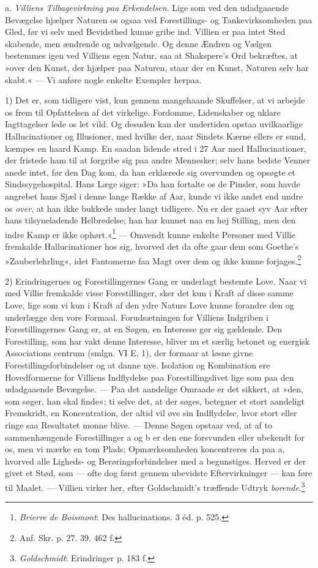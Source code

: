 \documentclass[12pt,a4paper,openany]{book}
\newcommand{\opage}[1]{\marginnote{\footnotesize\textit{[#1]}}}
\begin{document}
\opage{385}a. \emph{Villiens Tilbagevirkning paa Erkendelsen}. Lige som
ved den udadgaaende Bevægelse hjælper Naturen os ogsaa ved
Forestillings- og Tankevirksomheden paa Gled, før vi selv med Bevidsthed
kunne gribe ind. Villien er paa intet Sted skabende, men ændrende og
udvælgende. Og denne Ændren og Vælgen bestemmes igen ved Villiens egen
Natur, saa at Shakspere’s Ord bekræftes, at »over den Kunst, der hjælper
paa Naturen, staar der en Kunst, Naturen selv har skabt.« --- Vi anføre
nogle enkelte Exempler herpaa.

1) Det er, som tidligere vist, kun gennem mangehaande Skuffelser, at vi
arbejde os frem til Opfattelsen af det virkelige. Fordomme, Lidenskaber
og uklare Iagttagelser lede os let vild. Og desuden kan der undertiden
opstaa uvilkaarlige Hallucinationer og Illusioner, med hvilke der, naar
Sindets Kærne ellers er sund, kæmpes en haard Kamp. En saadan lidende
stred i 27 Aar med Hallucinationer, der fristede ham til at forgribe sig
paa andre Mennesker; selv hans bedste Venner anede intet, før den Dag
kom, da han erklærede sig overvunden og opsøgte et Sindssygehospital.
Hans Læge siger: »Da han fortalte os de Pinsler, som havde angrebet hans
Sjæl i denne lange Række af Aar, kunde vi ikke andet end undre os
\emph{over}, at han ikke bukkede under langt tidligere. Nu er der gaaet
syv Aar efter hans tilsyneladende Helbredelse; han har kunnet naa en høj
Stilling, men den indre Kamp er ikke ophørt.«\footnote[1]{\emph{Brierre
de Boismont}: Des hallucinations. 3 éd. p. 525.} --- Omvendt kunne
enkelte Personer med Villie fremkalde Hallucinationer hos sig, hvorved
det da ofte gaar dem som Goethe’s »Zauberlehrling«, idet Fantomerne faa
Magt over dem og ikke kunne forjages.\footnote[2]{Anf. Skr. p. 27. 39.
462 f.}

2) Erindringernes og Forestillingernes Gang er underlagt bestemte Love.
Naar vi med Villie fremkalde visse Forestillinger, sker det kun i Kraft
af disse samme Love, lige som vi kun i Kraft af den ydre Naturs Love
kunne forandre den og underlægge den vore Formaal. Forudsætningen for
Villiens Indgriben i Forestillingernes Gang er, at en Søgen, en
Interesse gør sig gældende. Den Forestilling, som har vakt denne
Interesse, bliver nu et særlig betonet og energisk Associations%
\opage{386}centrum (smlgn. VI E, 1), der formaar at løsne givne
Forestillingsforbindelser og at danne nye. Isolation og Kombination ere
Hovedformerne for Villiens Indflydelse paa Forestillingslivet lige som
paa den udadgaaende Bevægelse. --- Paa det aandelige Omraade er det
sikkert, at »den, som søger, han skal finde«; ti selve det, at der
søges, betegner et stort aandeligt Fremskridt, en Koncentration, der
altid vil øve sin Indflydelse, hvor stort eller ringe saa Resultatet
monne blive. --- Denne Søgen opstaar ved, at af to sammenhængende
Forestillinger a og b er den ene forsvunden eller ubekendt for os, men
vi mærke en tom Plads; Opmærksomheden koncentreres da paa a, hvorved
alle Ligheds- og Berøringsforbindelser med a begunstiges. Herved er der
givet et Stød, som --- ofte dog først gennem ubevidste Eftervirkninger
--- kan føre til Maalet. --- Villien virker her, efter Goldschmidt’s
træffende Udtryk \emph{borende}.\footnote[1]{\emph{Goldschmidt}:
Erindringer p. 183 f.}
\end{document}
